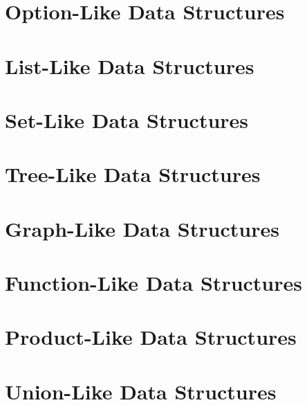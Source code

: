 \documentclass{book}
\begin{document}
\chapter{Option-Like Data Structures}\label{sec:ad:option}
 

\chapter{List-Like Data Structures}\label{sec:ad:lists}
 

\chapter{Set-Like Data Structures}\label{sec:ad:sets}
 

\chapter{Tree-Like Data Structures}\label{sec:ad:trees}
 

\chapter{Graph-Like Data Structures}\label{sec:ad:graphs}
 

\chapter{Function-Like Data Structures}\label{sec:ad:functions}

\chapter{Product-Like Data Structures}\label{sec:ad:products}

\chapter{Union-Like Data Structures}\label{sec:ad:unions}
\end{document}
